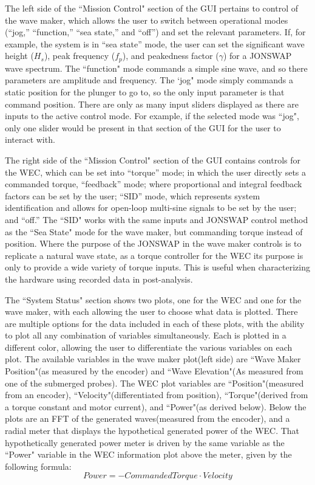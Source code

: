 \documentclass[11pt, letterpaper]{article}
\begin{document}
The left side of the ``Mission Control" section of the GUI pertains to control of the wave maker, which allows the user to switch between operational modes (``jog,'' ``function,'' ``sea state,'' and ``off'') and set the relevant parameters.
If, for example, the system is in ``sea state'' mode, the user can set the significant wave height ($H_s$), peak frequency ($f_p$), and peakedness factor ($\gamma$) for a JONSWAP wave spectrum.
The ``function" mode commands a simple sine wave, and so there parameters are amplitude and frequency. 
The `jog" mode simply commands a static position for the plunger to go to, so the only input parameter is that command position. 
There are only as many input sliders displayed as there are inputs to the active control mode. 
For example, if the selected mode was ``jog", only one slider would be present in that section of the GUI for the user to interact with.

The right side of the ``Mission Control" section of the GUI  contains controls for the WEC, which can be set into ``torque'' mode; in which the user directly sets a commanded torque, ``feedback'' mode; where proportional and integral feedback factors can be set by the user; ``SID'' mode, which represents system identification and allows for open-loop multi-sine signals to be set by the user; and ``off.''
The ``SID" works with the same inputs and JONSWAP control method as the ``Sea State" mode for the wave maker, but commanding torque instead of position.
Where the purpose of the JONSWAP in the wave maker controls is to replicate a natural wave state, as a torque controller for the WEC its purpose is only to provide a wide variety of torque inputs. 
This is useful when characterizing the hardware using recorded data in post-analysis.

The ``System Status" section shows two plots, one for the WEC and one for the wave maker, with each allowing the user to choose what data is plotted. 
There are multiple options for the data included in each of these plots, with the ability to plot all any combination of variables simultaneously.
Each is plotted in a different color, allowing the user to differentiate the various variables on each plot.
The available variables in the wave maker plot(left side) are ``Wave Maker Position"(as measured by the encoder) and ``Wave Elevation"(As measured from one of the submerged probes).
The WEC plot variables are ``Position"(measured from an encoder), ``Velocity"(differentiated from position), ``Torque"(derived from a torque constant and motor current), and ``Power"(as derived below).
Below the plots are an FFT of the generated waves(measured from the encoder), and a radial meter that displays the hypothetical generated power of the WEC.
That hypothetically generated power meter is driven by the same variable as the ``Power" variable in the WEC information plot above the meter, given by the following formula:
\begin{equation}
  Power = -Commanded Torque \cdot Velocity
\end{equation}
\end{document}

